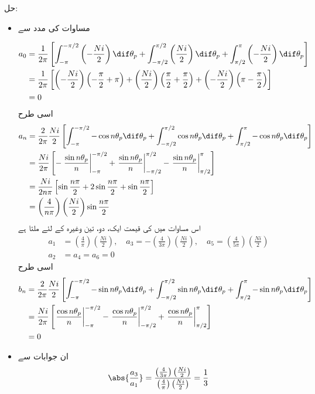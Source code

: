 حل:
\begin{itemize}
\item
مساوات کی مدد سے

\begin{align*}
a_0&=\frac{1}{2\pi} \left[\int_{-\pi}^{-\pi/2} \left(-\frac{Ni}{2} \right) \dif \theta_p+\int_{-\pi/2}^{\pi/2} \left (\frac{Ni}{2}\right) \dif \theta_p +\int_{\pi/2}^{\pi} \left(-\frac{Ni}{2}\right) \dif \theta_p  \right]\\
&=\frac{1}{2\pi} \left[\left(-\frac{Ni}{2} \right)\left(-\frac{\pi}{2}+\pi \right) +\left(\frac{Ni}{2} \right)\left(\frac{\pi}{2}+\frac{\pi}{2} \right)+\left(-\frac{Ni}{2} \right)\left(\pi-\frac{\pi}{2} \right)\right]\\
&=0
\end{align*}
اسی طرح
\begin{align*}
a_n&=\frac{2}{2\pi} \frac{Ni}{2} \left[\int_{-\pi}^{-\pi/2} -\cos n \theta_p \dif \theta_p +\int_{-\pi/2}^{\pi/2} \cos n \theta_p \dif \theta_p+\int_{\pi/2}^{\pi} -\cos n \theta_p \dif \theta_p\right]\\
&=\frac{Ni}{2\pi} \left[-\left. \frac{\sin n \theta_p}{n}\right|_{-\pi}^{-\pi/2} +\left. \frac{\sin n \theta_p}{n}\right|_{-\pi/2}^{\pi/2} -\left. \frac{\sin n \theta_p}{n}\right|_{\pi/2}^{\pi} \right]\\
&=\frac{Ni}{2n\pi} \left[\sin \frac{n\pi}{2}+2\sin \frac{n\pi}{2}+\sin \frac{n\pi}{2} \right]\\
&=\left(\frac{4}{n\pi}\right) \left( \frac{Ni}{2}\right) \sin \frac{n\pi}{2}
\end{align*}
اس مساوات میں  کی قیمت ایک، دو، تین وغیرہ کے لئے ملتا ہے
\begin{align*}
a_1&=\left(\frac{4}{\pi}\right) \left( \frac{Ni}{2}\right), \quad a_3=-\left(\frac{4}{3\pi}\right) \left( \frac{Ni}{2}\right), \quad a_5=\left(\frac{4}{5\pi}\right) \left( \frac{Ni}{2}\right)\\
a_2&=a_4=a_6=0
\end{align*}
اسی طرح
\begin{align*}
b_n&=\frac{2}{2\pi} \frac{Ni}{2} \left[\int_{-\pi}^{-\pi/2} -\sin n \theta_p \dif \theta_p +\int_{-\pi/2}^{\pi/2} \sin n \theta_p \dif \theta_p+\int_{\pi/2}^{\pi} -\sin n \theta_p \dif \theta_p\right]\\
&=\frac{Ni}{2\pi} \left[\left. \frac{\cos n \theta_p}{n}\right|_{-\pi}^{-\pi/2} -\left. \frac{\cos n \theta_p}{n}\right|_{-\pi/2}^{\pi/2} +\left. \frac{\cos n \theta_p}{n}\right|_{\pi/2}^{\pi} \right]\\
&=0
\end{align*}
\item
ان جوابات سے
\begin{align*}
\abs{\frac{a_3}{a_1}} =\frac{\left(\frac{4}{3\pi}\right) \left( \frac{Ni}{2}\right)}{\left(\frac{4}{\pi}\right) \left( \frac{Ni}{2}\right)}=\frac{1}{3}
\end{align*}
\end{itemize}
